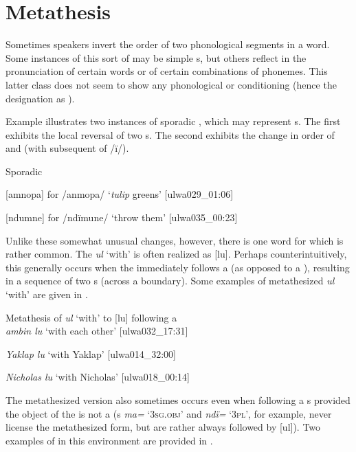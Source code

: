 
\section{Metathesis}\label{sec:2.6}


Sometimes speakers invert the order of two phonological segments in a word. Some instances of this sort of  may be simple s, but others reflect  in the pronunciation of certain words or of certain combinations of phonemes. This latter class does not seem to show any phonological or  conditioning (hence the designation as ).

  Example  illustrates two instances of sporadic , which may represent s. The first exhibits the local reversal of two s. The second exhibits the change in order of  and  (with subsequent  of /ï/).

\ea%
    \label{ex:phon:92}
          Sporadic 

    \ea  {}[amnopa] for /anmopa/ ‘\textit{tulip} greens’ [ulwa029\_01:06]

    \ex  {}[ndumne] for /ndïmune/ ‘throw them’ [ulwa035\_00:23]
    \z
\z

Unlike these somewhat unusual changes, however, there is one word for which  is rather common. The  \textit{ul} ‘with’ is often realized as [lu]. Perhaps counterintuitively, this  generally occurs when the  immediately follows a  (as opposed to a ), resulting in a sequence of two s (across a  boundary). Some examples of metathesized \textit{ul} ‘with’ are given in .

\ea%
    \label{ex:phon:94}
          Metathesis of \textit{ul} ‘with’ to [lu] following a \\
    \ea  \textit{ambin lu} ‘with each other’ [ulwa032\_17:31]

    \ex  \textit{Yaklap lu} ‘with Yaklap’ [ulwa014\_32:00]

    \ex  \textit{Nicholas lu} ‘with Nicholas’ [ulwa018\_00:14]
    \z
\z

The metathesized version also sometimes occurs even when following a s provided the object of the  is not a  (s \textit{ma=} ‘3\textsc{sg.obj}’ and \textit{ndï=} ‘3\textsc{pl}’, for example, never license the metathesized form, but are rather always followed by [ul]). Two examples of  in this environment are provided in .

